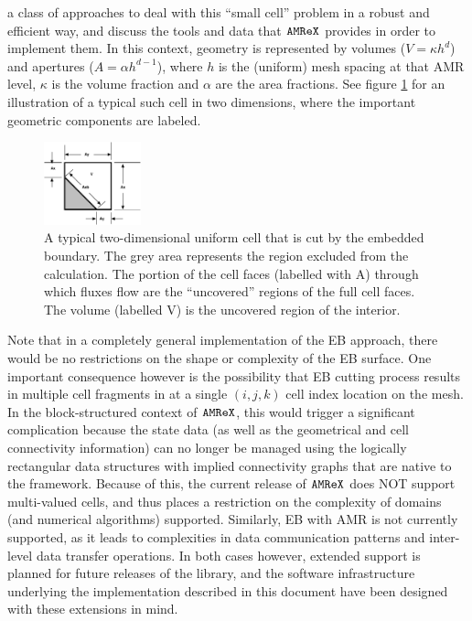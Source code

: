 a class of approaches to deal with this ``small cell'' problem in a
robust and efficient way, and discuss the tools and data that $\tt{AMReX}$
provides in order to implement them.  In this context,
geometry is represented by volumes ($V = \kappa h^d$) and apertures 
($A= \alpha h^{d-1}$), where $h$ is the (uniform) mesh spacing at that AMR level,
$\kappa$ is the volume fraction and $\alpha$ are the area fractions.
See figure \ref{fig::volume} for an illustration of a typical such cell in
two dimensions, where the important geometric components are labeled.
\begin{figure}[h]
  \centering
  \includegraphics[width=0.25\textwidth]{./EB/areas_and_volumes.pdf}
  \caption{\label{fig::volume}A typical two-dimensional uniform cell that is cut by the embedded
    boundary. The grey area represents the region excluded from the calculation.   The
    portion of the cell faces (labelled with A) through which fluxes flow are the ``uncovered''
    regions of the full cell faces.  The volume (labelled V) is the uncovered
    region of the interior.}
\end{figure}

Note that in a completely general implementation of the EB approach, there would be no restrictions
on the shape or complexity of the EB surface.  One important consequence however is the possibility
that EB cutting process results in multiple cell fragments in at a single $(i,j,k)$ cell index location
on the mesh.
In the block-structured context of $\tt{AMReX}$, this would trigger a significant complication
because the state data (as well as the geometrical and cell
connectivity information) can no longer be managed using the logically rectangular
data structures with implied connectivity graphs that are native to the framework.  Because of this,
the current release of $\tt{AMReX}$ does NOT support multi-valued cells, and thus places a
restriction on the complexity of domains (and numerical algorithms) supported.  Similarly, EB
with AMR is not currently supported, as it leads to complexities in data communication patterns
and inter-level data transfer operations.  In both cases however, extended support is
planned for future releases of the library, and the software infrastructure
underlying the implementation described in this document have been designed with these
extensions in mind.

